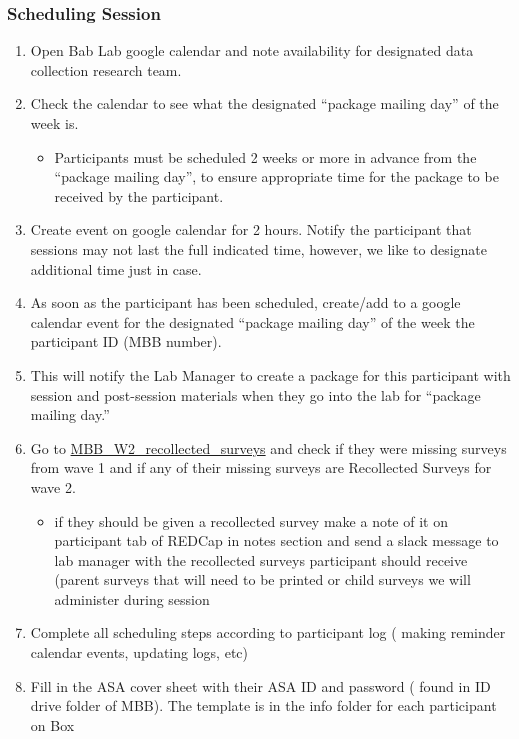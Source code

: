 \documentclass[
]{book}
\providecommand{\tightlist}{%
  \setlength{\itemsep}{0pt}\setlength{\parskip}{0pt}}
\begin{document}
\hypertarget{scheduling-session}{%
\subsubsection{Scheduling Session}\label{scheduling-session}}

\begin{enumerate}
\def\labelenumi{\arabic{enumi}.}
\tightlist
\item
  Open Bab Lab google calendar and note availability for designated data collection research team.
\item
  Check the calendar to see what the designated ``package mailing day'' of the week is.

  \begin{itemize}
  \tightlist
  \item
    Participants must be scheduled 2 weeks or more in advance from the ``package mailing day'', to ensure appropriate time for the package to be received by the participant.
  \end{itemize}
\item
  Create event on google calendar for 2 hours. Notify the participant that sessions may not last the full indicated time, however, we like to designate additional time just in case.
\item
  As soon as the participant has been scheduled, create/add to a google calendar event for the designated ``package mailing day'' of the week the participant ID (MBB number).
\item
  This will notify the Lab Manager to create a package for this participant with session and post-session materials when they go into the lab for ``package mailing day.''
\item
  Go to \href{https://app.box.com/file/788366897927}{MBB\_W2\_recollected\_surveys} and check if they were missing surveys from wave 1 and if any of their missing surveys are Recollected Surveys for wave 2.

  \begin{itemize}
  \tightlist
  \item
    if they should be given a recollected survey make a note of it on participant tab of REDCap in notes section and send a slack message to lab manager with the recollected surveys participant should receive (parent surveys that will need to be printed or child surveys we will administer during session
  \end{itemize}
\item
  Complete all scheduling steps according to participant log ( making reminder calendar events, updating logs, etc)
\item
  Fill in the ASA cover sheet with their ASA ID and password ( found in ID drive folder of MBB). The template is in the info folder for each participant on Box
\end{enumerate}
\end{document}

